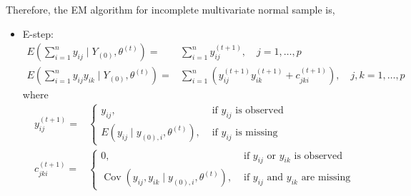 \begin{example}
    Therefore, the EM algorithm for incomplete multivariate normal sample is,
    \begin{itemize}
        \item E-step:
              \begin{equation}
                  \begin{aligned}
                      E\left(\sum_{i=1}^{n} y_{i j} \mid Y_{(0)}, \theta^{(t)}\right)=         & \sum_{i=1}^{n} y_{i j}^{(t+1)}, \quad j=1, \ldots, p                                                  \\
                      E\left(\sum_{i=1}^{n} y_{i j} y_{i k} \mid Y_{(0)}, \theta^{(t)}\right)= & \sum_{i=1}^{n}\left(y_{i j}^{(t+1)} y_{i k}^{(t+1)}+c_{j k i}^{(t+1)}\right), \quad j, k=1, \ldots, p
                  \end{aligned}
              \end{equation}
              where
              \begin{equation}
                  \begin{aligned}
                      y_{i j}^{(t+1)}=   & \left\{\begin{array}{ll}
                                                      y_{i j},                                             & \text { if } y_{i j} \text { is observed} \\
                                                      E\left(y_{i j} \mid y_{(0), i}, \theta^{(t)}\right), & \text { if } y_{i j} \text { is missing}
                                                  \end{array}\right.                                                                         \\
                      c_{j k i}^{(t+1)}= & \left\{\begin{array}{ll}
                                                      0,                                                                             & \text { if } y_{i j} \text { or } y_{i k} \text { is observed}  \\
                                                      \operatorname{Cov}\left(y_{i j}, y_{i k} \mid y_{(0), i}, \theta^{(t)}\right), & \text { if } y_{i j} \text { and } y_{i k} \text { are missing}
                                                  \end{array}\right.
                  \end{aligned}
              \end{equation}


\end{itemize}
\end{example}
